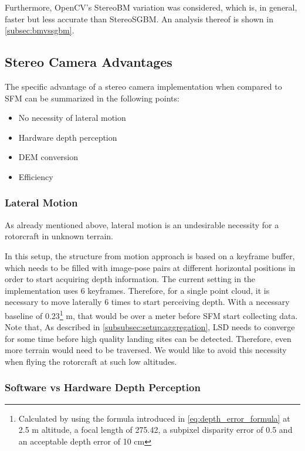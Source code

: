 Furthermore, OpenCV's StereoBM variation was considered, which is, in general, faster but less accurate than StereoSGBM. An analysis thereof is shown in \cref{subsec:bmvssgbm}.


\subsection{Stereo Camera Advantages}

The specific advantage of a stereo camera implementation when compared to SFM can be summarized in the following points:

\begin{itemize}
    \item No necessity of lateral motion
    \item Hardware depth perception
    \item DEM conversion
    \item Efficiency
\end{itemize}

\subsubsection{Lateral Motion}

As already mentioned above, lateral motion is an undesirable necessity for a rotorcraft in unknown terrain. 

In this setup, the structure from motion approach is based on a keyframe buffer, which needs to be filled with image-pose pairs at different horizontal positions in order to start acquiring depth information. The current setting in the implementation \citet{SFM} uses 6 keyframes. Therefore, for a single point cloud, it is necessary to move laterally 6 times to start perceiving depth. With a necessary baseline of 0.23\footnote[2]{Calculated by using the formula introduced in \cref{eq:depth_error_formula} at 2.5 m altitude, a focal length of 275.42, a subpixel disparity error of 0.5 and an acceptable depth error of 10 cm} m, that would be over a meter before SFM start collecting data. Note that, As described in \cref{subsubsec:setup:aggregation}, LSD needs to converge for some time before high quality landing sites can be detected. Therefore, even more terrain would need to be traversed. We would like to avoid this necessity when flying the rotorcraft at such low altitudes.

\subsubsection{Software vs Hardware Depth Perception}

